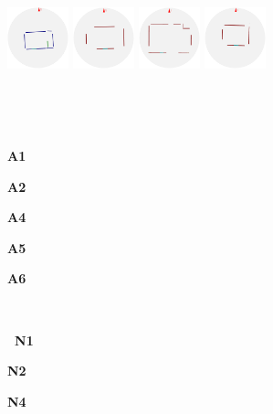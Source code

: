 \begin{figure}[t]
\begin{center}
\begin{minipage}[b]{3.7in}
  \includegraphics[width=0.7in]{../gi2012_userstudy/images/section2/5_2D_walls_rotate} %
  \includegraphics[width=0.7in]{../gi2012_userstudy/images/section2/9_2D_walls_rotate} %
  \includegraphics[width=0.7in]{../gi2012_userstudy/images/section2/10_2D_walls_rotate} %
  \includegraphics[width=0.7in]{../gi2012_userstudy/images/section2/11_2D_walls_rotate} %
\end{minipage}
\vspace{-1.12in}
\\
\begin{minipage}{1.4in}~\end{minipage}
\begin{minipage}{0.7in}{\bf A1}\end{minipage}
\begin{minipage}{0.7in}{\bf A2}\end{minipage}
\begin{minipage}{0.7in}{\bf A4}\end{minipage}
\begin{minipage}{0.7in}{\bf A5}\end{minipage}
\begin{minipage}{0.7in}{\bf A6}\end{minipage}
\vspace{0.78in}
\\
\begin{minipage}{1.4in}{\bf ~N1}\end{minipage}
\begin{minipage}{0.7in}{\bf N2}\end{minipage}
\begin{minipage}{0.7in}{\bf N4}\end{minipage}

\end{center}
\end{figure}
